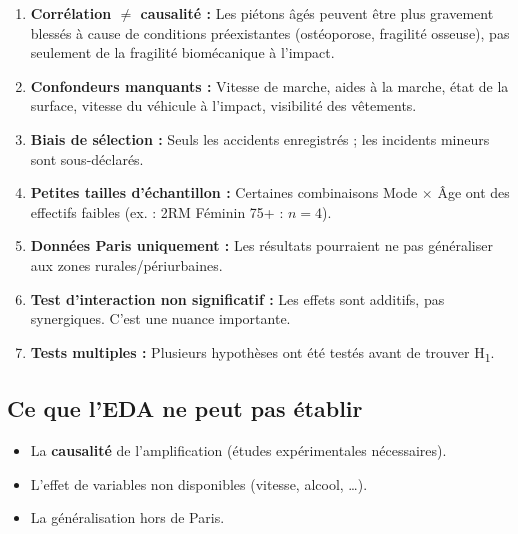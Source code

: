 \documentclass[12pt,a4paper]{article}
\begin{document}
\begin{enumerate}[label=\textbf{\arabic*.}]
  \item \textbf{Corrélation $\neq$ causalité :} Les piétons \^{a}gés peuvent
        être plus gravement blessés à cause de conditions préexistantes
        (ostéoporose, fragilité osseuse), pas seulement de la fragilité
        biomécanique à l'impact.

  \item \textbf{Confondeurs manquants :} Vitesse de marche, aides à la
        marche, état de la surface, vitesse du v\'{e}hicule à l'impact,
        visibilité des v\^{e}tements.

  \item \textbf{Biais de s\'{e}lection :} Seuls les accidents enregistrés ;
        les incidents mineurs sont sous-d\'{e}clarés.

  \item \textbf{Petites tailles d'\'{e}chantillon :} Certaines combinaisons
        Mode $\times$ \^Age ont des effectifs faibles (ex. : 2RM Féminin
        75+ : $n = 4$).

  \item \textbf{Données Paris uniquement :} Les r\'{e}sultats pourraient
        ne pas g\'{e}n\'{e}raliser aux zones rurales/p\'{e}riurbaines.

  \item \textbf{Test d'interaction non significatif :} Les effets sont
        additifs, pas synergiques. C'est une nuance importante.

  \item \textbf{Tests multiples :} Plusieurs hypoth\`{e}ses ont \'{e}t\'{e}
        test\'{e}s avant de trouver H\textsubscript{1}.
\end{enumerate}

\subsection{Ce que l'EDA ne peut pas \'{e}tablir}

\begin{itemize}
  \item La \textbf{causalit\'{e}} de l'amplification (\'{e}tudes
        exp\'{e}rimentales n\'{e}cessaires).
  \item L'effet de variables non disponibles (vitesse, alcool, \ldots).
  \item La g\'{e}n\'{e}ralisation hors de Paris.
\end{itemize}
\end{document}

